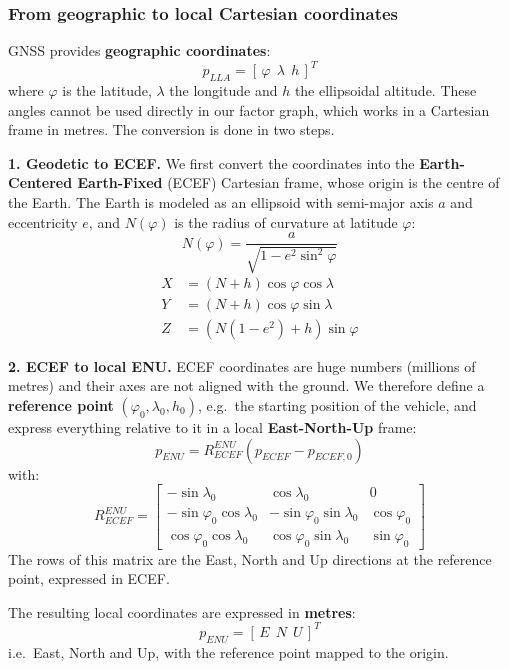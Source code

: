 \subsubsection{From geographic to local Cartesian coordinates}
GNSS provides \textbf{geographic coordinates}:
\[
p_{LLA} = \left[\, \varphi \ \ \lambda \ \ h \,\right]^T
\]
where $\varphi$ is the latitude, $\lambda$ the longitude and $h$ the ellipsoidal altitude. These angles cannot be used directly in our factor graph, which works in a Cartesian frame in metres. The conversion is done in two steps.

\textbf{1. Geodetic to ECEF.} We first convert the coordinates into the \textbf{Earth-Centered Earth-Fixed} (ECEF) Cartesian frame, whose origin is the centre of the Earth. The Earth is modeled as an ellipsoid with semi-major axis $a$ and eccentricity $e$, and $N(\varphi)$ is the radius of curvature at latitude $\varphi$:
\[
N(\varphi) = \frac{a}{\sqrt{1 - e^2 \sin^2\varphi}}
\]
\[
\begin{aligned}
X &= (N + h) \cos\varphi \cos\lambda\\
Y &= (N + h) \cos\varphi \sin\lambda\\
Z &= \left(N(1 - e^2) + h\right) \sin\varphi
\end{aligned}
\]

\textbf{2. ECEF to local ENU.} ECEF coordinates are huge numbers (millions of metres) and their axes are not aligned with the ground. We therefore define a \textbf{reference point} $(\varphi_0, \lambda_0, h_0)$, e.g.\ the starting position of the vehicle, and express everything relative to it in a local \textbf{East-North-Up} frame:
\[
p_{ENU} = R^{ENU}_{ECEF}\left(p_{ECEF} - p_{ECEF,0}\right)
\]
with:
\[
R^{ENU}_{ECEF} =
\begin{bmatrix}
-\sin\lambda_0 & \cos\lambda_0 & 0\\
-\sin\varphi_0 \cos\lambda_0 & -\sin\varphi_0 \sin\lambda_0 & \cos\varphi_0\\
\cos\varphi_0 \cos\lambda_0 & \cos\varphi_0 \sin\lambda_0 & \sin\varphi_0
\end{bmatrix}
\]
The rows of this matrix are the East, North and Up directions at the reference point, expressed in ECEF.

The resulting local coordinates are expressed in \textbf{metres}:
\[
p_{ENU} = \left[\, E \ \ N \ \ U \,\right]^T
\]
i.e.\ East, North and Up, with the reference point mapped to the origin.

